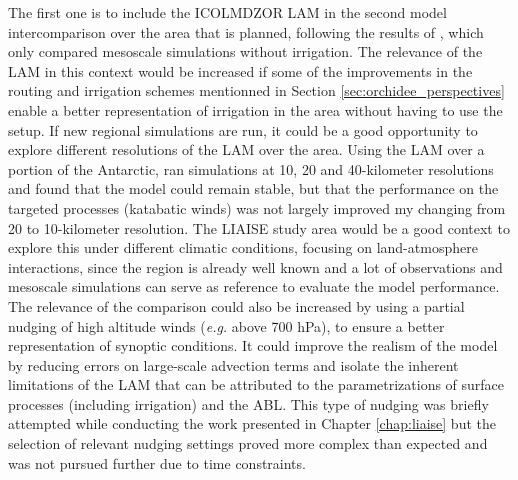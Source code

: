 The first one is to include the ICOLMDZOR LAM in the second model intercomparison over the area that is planned, following the results of \citet{jimenez_land-surface_2025}, which only compared mesoscale simulations without irrigation.
The relevance of the LAM in this context would be increased if some of the improvements in the routing and irrigation schemes mentionned in Section \ref{sec:orchidee_perspectives} enable a better representation of irrigation in the area without having to use the \irrboost setup.
If new regional simulations are run, it could be a good opportunity to explore different resolutions of the LAM over the area. Using the LAM over a portion of the Antarctic, \citet{wiener2025} ran simulations at 10, 20 and 40-kilometer resolutions and found that the model could remain stable, but that the performance on the targeted processes (katabatic winds) was not largely improved my changing from 20 to 10-kilometer resolution. 
The LIAISE study area would be a good context to explore this under different climatic conditions, focusing on land-atmosphere interactions, since the region is already well known and a lot of observations and mesoscale simulations can serve as reference to evaluate the model performance.
The relevance of the comparison could also be increased by using a partial nudging of high altitude winds (\textit{e.g.} above 700 hPa), to ensure a better representation of synoptic conditions. It could improve the realism of the model by reducing errors on large-scale advection terms and isolate the inherent limitations of the LAM that can be attributed to the parametrizations of surface processes (including irrigation) and the ABL. This type of nudging was briefly attempted while conducting the work presented in Chapter \ref{chap:liaise} but the selection of relevant nudging settings proved more complex than expected and was not pursued further due to time constraints.

